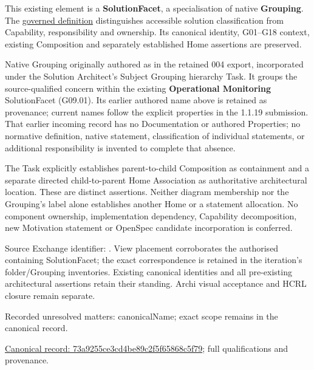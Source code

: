 This existing element is a \textbf{SolutionFacet}, a specialisation of native
\textbf{Grouping}. The \href{\detokenize{../../../../../../../governance/continuum-representation.md#solutionfacet-classification--1119-candidate}}{governed definition}
distinguishes accessible solution classification from Capability, responsibility
and ownership. Its canonical identity, G01–G18 context, existing Composition
and separately established Home assertions are preserved.



Native Grouping originally authored as \texttt{} in the retained 004 export,
incorporated under the Solution Architect's Subject Grouping hierarchy Task.
It groups the source-qualified \texttt{} concern within
the existing \textbf{Operational Monitoring} SolutionFacet (G09.01). Its earlier authored name above is retained as provenance; current names
follow the explicit properties in the 1.1.19 submission.
That earlier incoming record has no Documentation or authored Properties; no normative
definition, native statement, classification of individual statements, or
additional responsibility is invented to complete that absence.



The Task explicitly establishes parent-to-child Composition as containment and
a separate directed child-to-parent Home Association as authoritative architectural
location. These are distinct assertions. Neither diagram membership nor the
Grouping's label alone establishes another Home or a statement allocation.
No component ownership, implementation dependency, Capability decomposition,
new Motivation statement or OpenSpec candidate incorporation is conferred.



Source Exchange identifier: \texttt{}. View placement corroborates
the authorised containing SolutionFacet; the exact correspondence is retained in the
iteration's folder/Grouping inventories. Existing canonical identities and all
pre-existing architectural assertions retain their standing. Archi visual
acceptance and HCRL closure remain separate.


{\small Recorded unresolved matters: canonicalName; exact scope remains in the canonical record.}\par
{\footnotesize \href{../../../../../../../continuum/grouping/73a9255ce3cd4be89c2f5f65868c5f79.md}{Canonical record: 73a9255ce3cd4be89c2f5f65868c5f79}; full qualifications and provenance.}\par
